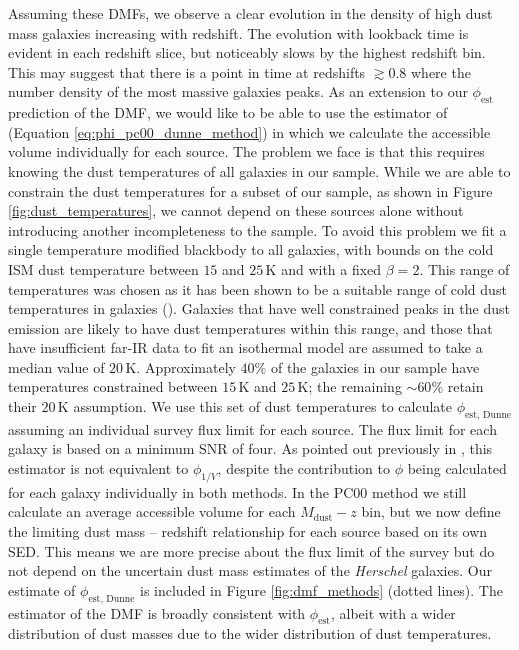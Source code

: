 Assuming these DMFs, we observe a clear evolution in the density of high dust mass galaxies increasing with redshift. The evolution with lookback time is evident in each redshift slice, but noticeably slows by the highest redshift bin. This may suggest that there is a point in time at redshifts $\gtrsim 0.8$ where the number density of the most massive galaxies peaks. As an extension to our $\phi_{\textrm{est}}$ prediction of the DMF, we would like to be able to use the estimator of \citealt{Dunne_2011} (Equation \ref{eq:phi_pc00_dunne_method}) in which we calculate the accessible volume individually for each source. The problem we face is that this requires knowing the dust temperatures of all galaxies in our sample. While we are able to constrain the dust temperatures for a subset of our sample, as shown in Figure \ref{fig:dust_temperatures}, we cannot depend on these sources alone without introducing another incompleteness to the sample. To avoid this problem we fit a single temperature modified blackbody to all galaxies, with bounds on the cold ISM dust temperature between $15$ and $25\,$K and with a fixed $\beta = 2$. This range of temperatures was chosen as it has been shown to be a suitable range of cold dust temperatures in galaxies (\citealt{Dunne_2001, daCunha_2008, Smith_2012b, Clark_2015, Beeston_2018}). Galaxies that have well constrained peaks in the dust emission are likely to have dust temperatures within this range, and those that have insufficient far-IR data to fit an isothermal model are assumed to take a median value of $20\,$K. Approximately $40\%$ of the galaxies in our sample have temperatures constrained between $15\,$K and $25\,$K; the remaining $\sim 60\%$ retain their $20\,$K assumption. We use this set of dust temperatures to calculate $\phi_{\textrm{est, Dunne}}$ assuming an individual survey flux limit for each source. The flux limit for each galaxy is based on a minimum SNR of four. As pointed out previously in \citealt{Dunne_2011}, this estimator is not equivalent to $\phi_{1/V}$, despite the contribution to $\phi$ being calculated for each galaxy individually in both methods. In the PC00 method we still calculate an average accessible volume for each $M_{\textrm{dust}} - z$ bin, but we now define the limiting dust mass -- redshift relationship for each source based on its own SED. This means we are more precise about the flux limit of the survey but do not depend on the uncertain dust mass estimates of the \textit{Herschel} galaxies. Our estimate of $\phi_{\textrm{est, Dunne}}$ is included in Figure \ref{fig:dmf_methods} (dotted lines). The \citealt{Dunne_2011} estimator of the DMF is broadly consistent with $\phi_{\textrm{est}}$, albeit with a wider distribution of dust masses due to the wider distribution of dust temperatures.

